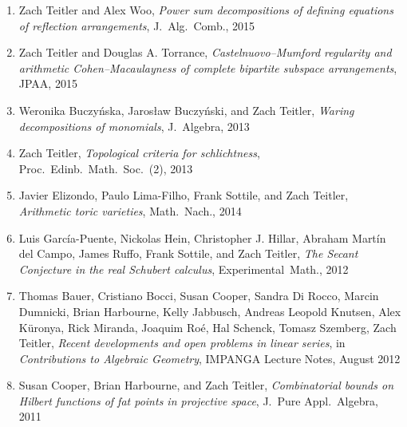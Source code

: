 \documentclass[12pt]{article}
\begin{document}
\begin{enumerate}[revarabic,leftmargin=*]
\item Zach Teitler and Alex Woo,
\emph{Power sum decompositions of defining equations of reflection arrangements},
J.~Alg.\ Comb.,
2015

\item Zach Teitler and Douglas A. Torrance,
\emph{Castelnuovo--Mumford regularity and arithmetic Cohen--Macaulayness of complete bipartite subspace arrangements},
JPAA,
2015

\item Weronika Buczy\'nska, Jaros{\l}aw Buczy\'nski, and Zach Teitler,
\emph{Waring decompositions of monomials},
J.\ Algebra,
2013

\item Zach Teitler,
\emph{Topological criteria for schlichtness},
Proc.\ Edinb.\ Math.\ Soc.\ (2),
2013

\item Javier Elizondo, Paulo Lima-Filho, Frank Sottile, and Zach Teitler,
\emph{Arithmetic toric varieties},
Math.\ Nach.,
2014

\item Luis Garc\'ia-Puente, Nickolas Hein, Christopher J. Hillar, Abraham Mart\'in del Campo, James Ruffo, Frank Sottile, and Zach Teitler,
\emph{The Secant Conjecture in the real Schubert calculus},
Experimental~Math.,
2012

\item
Thomas Bauer, Cristiano Bocci, Susan Cooper, Sandra Di Rocco, Marcin Dumnicki, Brian Harbourne, Kelly Jabbusch, Andreas Leopold Knutsen, Alex K\"uronya,
Rick Miranda, Joaquim Ro\'e, Hal Schenck, Tomasz Szemberg, Zach Teitler,
\emph{Recent developments and open problems in linear series},
in \textit{Contributions to Algebraic Geometry}, IMPANGA Lecture Notes, August 2012

\item Susan Cooper, Brian Harbourne, and Zach Teitler,
\emph{Combinatorial bounds on Hilbert functions of fat points in projective space},
J.\ Pure Appl.\ Algebra,
2011


\end{enumerate}
\end{document}
